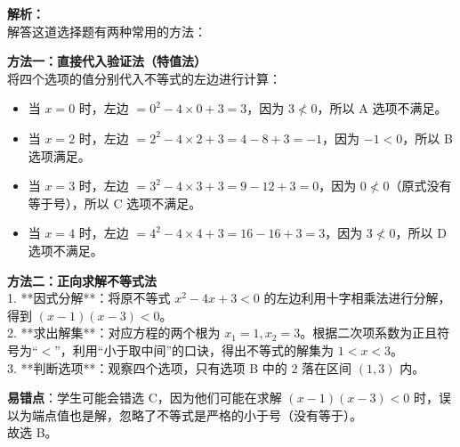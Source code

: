 \begin{solution}
    \textbf{解析：} \\
    解答这道选择题有两种常用的方法：
    
    \textbf{方法一：直接代入验证法（特值法）} \\
    将四个选项的值分别代入不等式的左边进行计算：
    \begin{itemize}
        \item 当 $x = 0$ 时，左边 $= 0^2 - 4 \times 0 + 3 = 3$，因为 $3 \nless 0$，所以 A 选项不满足。
        \item 当 $x = 2$ 时，左边 $= 2^2 - 4 \times 2 + 3 = 4 - 8 + 3 = -1$，因为 $-1 < 0$，所以 B 选项满足。
        \item 当 $x = 3$ 时，左边 $= 3^2 - 4 \times 3 + 3 = 9 - 12 + 3 = 0$，因为 $0 \nless 0$（原式没有等于号），所以 C 选项不满足。
        \item 当 $x = 4$ 时，左边 $= 4^2 - 4 \times 4 + 3 = 16 - 16 + 3 = 3$，因为 $3 \nless 0$，所以 D 选项不满足。
    \end{itemize}
    
    \textbf{方法二：正向求解不等式法} \\
    1. **因式分解**：将原不等式 $x^2 - 4x + 3 < 0$ 的左边利用十字相乘法进行分解，得到 $(x - 1)(x - 3) < 0$。 \\
    2. **求出解集**：对应方程的两个根为 $x_1 = 1, x_2 = 3$。根据二次项系数为正且符号为“$<$”，利用“小于取中间”的口诀，得出不等式的解集为 $1 < x < 3$。 \\
    3. **判断选项**：观察四个选项，只有选项 B 中的 $2$ 落在区间 $(1, 3)$ 内。
    
    \textbf{易错点}：学生可能会错选 C，因为他们可能在求解 $(x-1)(x-3)<0$ 时，误以为端点值也是解，忽略了不等式是严格的小于号（没有等于）。 \\
    故选 B。
\end{solution}